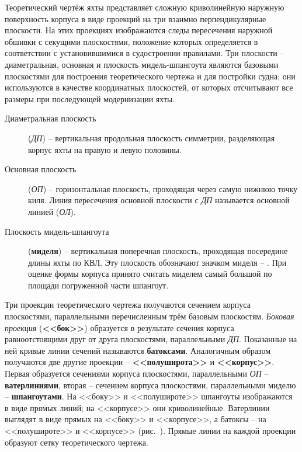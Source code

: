 Теоретический чертёж яхты представляет сложную криволинейную наружную
поверхность корпуса в виде проекций на три взаимно перпендикулярные
плоскости. На этих проекциях изображаются следы пересечения наружной
обшивки с секущими плоскостями, положение которых определяется в
соответствии с установившимися в судостроении правилами. Три плоскости
\--- диаметральная, основная и плоскость мидель-шпангоута являются
базовыми плоскостями для построения теоретического чертежа и для
постройки судна; они используются в качестве координатных плоскостей,
от которых отсчитывают все размеры при последующей модернизации яхты.

\begin{description}
\item [Диаметральная плоскость]
  (\textit{ДП}) \--- вертикальная продольная плоскость симметрии,
  разделяющая корпус яхты на правую и левую половины.
\item [Основная плоскость] (\textit{ОП})
  \--- горизонтальная плоскость, проходящая через самую нижнюю точку
  киля. Линия пересечения основной плоскости с \textit{ДП} называется
  основной линией (\textit{ОЛ}).
\item [Плоскость мидель-шпангоута]
  (\textbf{миделя}) \--- вертикальная поперечная
  плоскость, проходящая посередине длины яхты по КВЛ. Эту плоскость
  обозначают значком миделя \--- \midelsign. При оценке формы корпуса
  принято считать миделем самый большой по площади погруженной части
  шпангоут.
\end{description}

Три проекции теоретического чертежа получаются сечением корпуса
плоскостями, параллельными перечисленным трём базовым
плоскостям. \textit{Боковая проекция} (\textbf{<<бок>>}) образуется в
результате сечения корпуса равноотстоящими друг от друга плоскостями,
параллельными \textit{ДП}. Показанные на ней кривые линии сечений
называются \textbf{батоксами}. Аналогичным образом получаются две
другие проекции \--- \textbf{<<полуширота>>} и
\textbf{<<корпус>>}. Первая образуется сечениями корпуса плоскостями,
параллельными \textit{ОП} \--- \textbf{ватерлиниями}, вторая \---
сечением корпуса плоскостями, параллельными миделю \---
\textbf{шпангоутами}. На <<боку>> и <<полушироте>> шпангоуты
изображаются в виде прямых линий; на <<корпусе>> они
криволинейные. Ватерлинии выглядят в виде прямых на <<боку>> и
<<корпусе>>, а батоксы \--- на <<полушироте>> и <<корпусе>>
(рис.~). Прямые линии на каждой проекции образуют сетку
теоретического чертежа.

